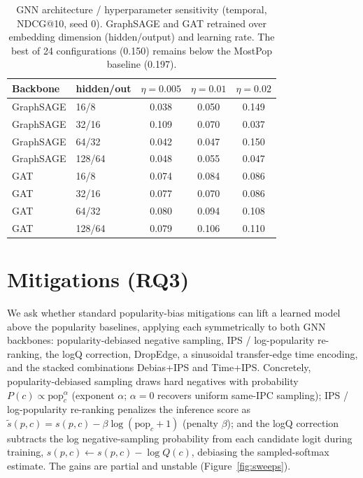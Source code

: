 \documentclass[preprint,12pt]{elsarticle}
\begin{document}
\begin{table}[t]
\centering
\caption{GNN architecture / hyperparameter sensitivity (temporal, NDCG@10, seed 0).
GraphSAGE and GAT retrained over embedding dimension (hidden/output) and learning rate.
The best of 24 configurations (0.150) remains below the MostPop baseline (0.197).}
\label{tab:arch}
\begin{tabular}{llccc}
\toprule
Backbone & hidden/out & $\eta=0.005$ & $\eta=0.01$ & $\eta=0.02$ \\
\midrule
GraphSAGE & 16/8   & 0.038 & 0.050 & 0.149 \\
GraphSAGE & 32/16  & 0.109 & 0.070 & 0.037 \\
GraphSAGE & 64/32  & 0.042 & 0.047 & 0.150 \\
GraphSAGE & 128/64 & 0.048 & 0.055 & 0.047 \\
GAT       & 16/8   & 0.074 & 0.084 & 0.086 \\
GAT       & 32/16  & 0.077 & 0.070 & 0.086 \\
GAT       & 64/32  & 0.080 & 0.094 & 0.108 \\
GAT       & 128/64 & 0.079 & 0.106 & 0.110 \\
\bottomrule
\end{tabular}
\end{table}

\section{Mitigations (RQ3)}
\label{sec:mitigation}

We ask whether standard popularity-bias mitigations can lift a learned model above the
popularity baselines, applying each symmetrically to both GNN backbones:
popularity-debiased negative sampling, IPS / log-popularity
re-ranking, the logQ correction, DropEdge, a sinusoidal
transfer-edge time encoding, and the stacked combinations Debias+IPS and Time+IPS.
Concretely, popularity-debiased sampling draws hard negatives with probability
$P(c)\propto \mathrm{pop}_c^{\alpha}$ (exponent $\alpha$; $\alpha{=}0$ recovers uniform
same-IPC sampling); IPS / log-popularity re-ranking penalizes the inference score as
$\tilde{s}(p,c)=s(p,c)-\beta\log(\mathrm{pop}_c+1)$ (penalty $\beta$); and the logQ
correction subtracts the log negative-sampling probability from each candidate logit
during training, $s(p,c)\leftarrow s(p,c)-\log Q(c)$, debiasing the sampled-softmax
estimate. The gains are partial and unstable (Figure~\ref{fig:sweeps}).
\end{document}

